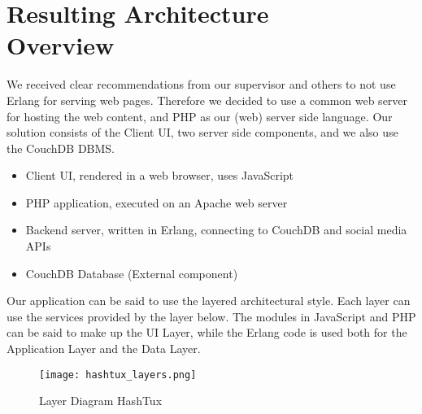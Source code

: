 \chapter[Resulting Architecture Overview]{Resulting Architecture\\ Overview}
We received clear recommendations from our supervisor and others to not use
Erlang for serving web pages. Therefore we decided to use a common web server
for hosting the web content, and PHP as our (web) server side language. Our
solution consists of the Client UI, two server side components, and we also use
the CouchDB DBMS.
\begin{itemize}
  \item Client UI, rendered in a web browser, uses JavaScript
  \item PHP application, executed on an Apache web server
  \item Backend server, written in Erlang, connecting to CouchDB and social
     media APIs
  \item CouchDB Database (External component)
\end{itemize}
Our application can be said to use the layered architectural style. Each layer
can use the services provided by the layer below. The modules in JavaScript and
PHP can be said to make up the UI Layer, while the Erlang code is used both for
the Application Layer and the Data Layer. \newline

\begin{figure}[ht]
  \centering
  \texttt{[image: hashtux\_layers.png]}
  \caption{Layer Diagram HashTux}
\end{figure}